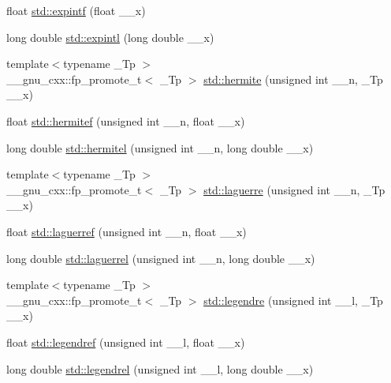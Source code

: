 \begin{DoxyCompactItemize}
\item 
float \hyperlink{group__tr29124__math__spec__func_ga5842816f6eed2594e0a327df4e4a2a47}{std\+::expintf} (float \+\_\+\+\_\+x)
\item 
long double \hyperlink{group__tr29124__math__spec__func_ga1329130b32328d0666e290ee5931fa4f}{std\+::expintl} (long double \+\_\+\+\_\+x)
\item 
{\footnotesize template$<$typename \+\_\+\+Tp $>$ }\\\+\_\+\+\_\+gnu\+\_\+cxx\+::fp\+\_\+promote\+\_\+t$<$ \+\_\+\+Tp $>$ \hyperlink{group__tr29124__math__spec__func_ga8bd1626f1e3f7256c4fd13579f881183}{std\+::hermite} (unsigned int \+\_\+\+\_\+n, \+\_\+\+Tp \+\_\+\+\_\+x)
\item 
float \hyperlink{group__tr29124__math__spec__func_ga94dae7444bb349e33057a92932db8abe}{std\+::hermitef} (unsigned int \+\_\+\+\_\+n, float \+\_\+\+\_\+x)
\item 
long double \hyperlink{group__tr29124__math__spec__func_ga21f8e312ee3e65286f86bf141b0f32e0}{std\+::hermitel} (unsigned int \+\_\+\+\_\+n, long double \+\_\+\+\_\+x)
\item 
{\footnotesize template$<$typename \+\_\+\+Tp $>$ }\\\+\_\+\+\_\+gnu\+\_\+cxx\+::fp\+\_\+promote\+\_\+t$<$ \+\_\+\+Tp $>$ \hyperlink{group__tr29124__math__spec__func_ga9d7b24a11dad27690387405548973ef9}{std\+::laguerre} (unsigned int \+\_\+\+\_\+n, \+\_\+\+Tp \+\_\+\+\_\+x)
\item 
float \hyperlink{group__tr29124__math__spec__func_gada763419b0e21b38e38daa8b6eb56a8c}{std\+::laguerref} (unsigned int \+\_\+\+\_\+n, float \+\_\+\+\_\+x)
\item 
long double \hyperlink{group__tr29124__math__spec__func_gaaf8b141edf9163b37ea4f2ed3e0191fc}{std\+::laguerrel} (unsigned int \+\_\+\+\_\+n, long double \+\_\+\+\_\+x)
\item 
{\footnotesize template$<$typename \+\_\+\+Tp $>$ }\\\+\_\+\+\_\+gnu\+\_\+cxx\+::fp\+\_\+promote\+\_\+t$<$ \+\_\+\+Tp $>$ \hyperlink{group__tr29124__math__spec__func_gad06811f4e139b0ba84235c1f0d34d86e}{std\+::legendre} (unsigned int \+\_\+\+\_\+l, \+\_\+\+Tp \+\_\+\+\_\+x)
\item 
float \hyperlink{group__tr29124__math__spec__func_gaed94e3c664c99f5204da75be75aeac21}{std\+::legendref} (unsigned int \+\_\+\+\_\+l, float \+\_\+\+\_\+x)
\item 
long double \hyperlink{group__tr29124__math__spec__func_ga1b39bc22e3cc4860d08eb54099460391}{std\+::legendrel} (unsigned int \+\_\+\+\_\+l, long double \+\_\+\+\_\+x)

\end{DoxyCompactItemize}
